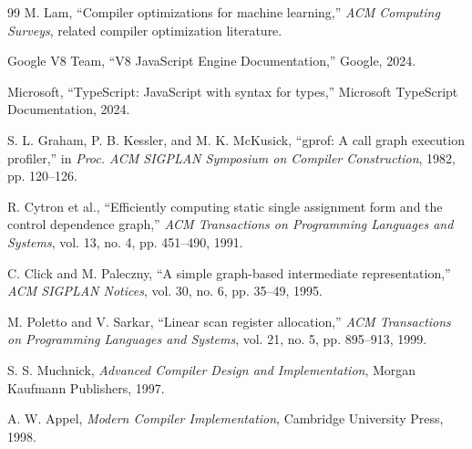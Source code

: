 \documentclass[12pt,a4paper]{article}
\begin{document}
\begin{thebibliography}{99}
M. Lam,
``Compiler optimizations for machine learning,''
\textit{ACM Computing Surveys}, related compiler optimization literature.

Google V8 Team,
``V8 JavaScript Engine Documentation,''
Google, 2024.

Microsoft,
``TypeScript: JavaScript with syntax for types,''
Microsoft TypeScript Documentation, 2024.

S. L. Graham, P. B. Kessler, and M. K. McKusick,
``gprof: A call graph execution profiler,''
in \textit{Proc. ACM SIGPLAN Symposium on Compiler Construction},
1982, pp. 120--126.

R. Cytron et al.,
``Efficiently computing static single assignment form and the control
dependence graph,''
\textit{ACM Transactions on Programming Languages and Systems},
vol. 13, no. 4, pp. 451--490, 1991.

C. Click and M. Paleczny,
``A simple graph-based intermediate representation,''
\textit{ACM SIGPLAN Notices}, vol. 30, no. 6, pp. 35--49, 1995.

M. Poletto and V. Sarkar,
``Linear scan register allocation,''
\textit{ACM Transactions on Programming Languages and Systems},
vol. 21, no. 5, pp. 895--913, 1999.

S. S. Muchnick,
\textit{Advanced Compiler Design and Implementation},
Morgan Kaufmann Publishers, 1997.

A. W. Appel,
\textit{Modern Compiler Implementation},
Cambridge University Press, 1998.

\end{thebibliography}

\end{document}
